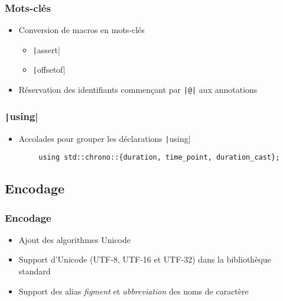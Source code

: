 \documentclass[C++.tex]{subfiles}
\begin{document}
\begin{frame}[fragile]
	\frametitle{Mots-clés}
	\begin{itemize}
		\item Conversion de macros en mots-clés
		\begin{itemize}
			\item \texttt|assert|
			\item \texttt|offsetof|
		\end{itemize}
		\item Réservation des identifiants commençant par \texttt{|@|} aux annotations
	\end{itemize}

\end{frame}

\begin{frame}[fragile]
	\frametitle{\texttt|using|}
	\begin{itemize}
		\item Accolades pour grouper les déclarations  \texttt|using|
	\end{itemize}

	\begin{verbatim}
		using std::chrono::{duration, time_point, duration_cast};
	\end{verbatim}

\end{frame}


\subsection*{Encodage}
\begin{frame}[fragile]
	\frametitle{Encodage}
	\begin{itemize}
		\item Ajout des algorithmes Unicode


		\item Support d'Unicode (UTF-8, UTF-16 et UTF-32) dans la bibliothèque standard
		\item Support des alias \textit{figment} et \textit{abbreviation} des noms de caractère
	\end{itemize}

\end{frame}
\end{document}
